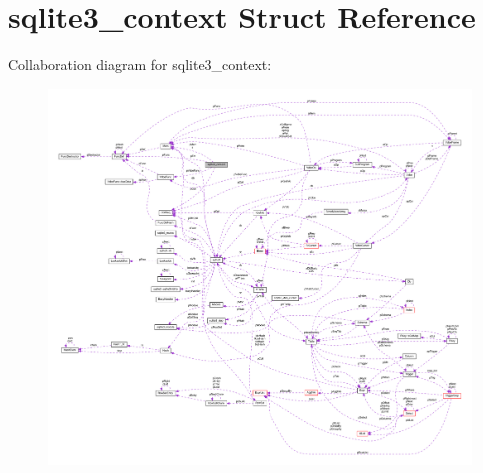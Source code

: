 \hypertarget{structsqlite3__context}{\section{sqlite3\-\_\-context Struct Reference}
\label{structsqlite3__context}
}


Collaboration diagram for sqlite3\-\_\-context\-:\nopagebreak
\begin{figure}[H]
\begin{center}
\leavevmode
\includegraphics[width=350pt]{structsqlite3__context__coll__graph}
\end{center}
\end{figure}
